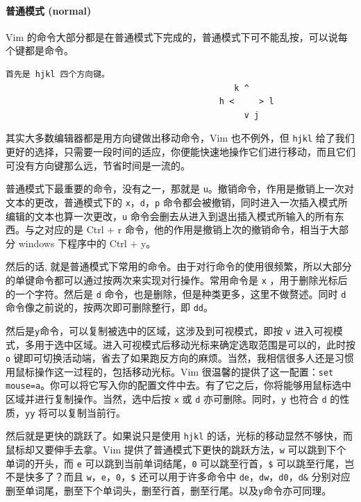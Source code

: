 \paragraph{普通模式 (normal)}

Vim 的命令大部分都是在普通模式下完成的，普通模式下可不能乱按，可以说每个键都是命令。

\begin{verbatim}
首先是 hjkl 四个方向键。                         
                                              k ^
                                           h <     > l
                                                v j
\end{verbatim}

其实大多数编辑器都是用方向键做出移动命令，Vim 也不例外，但 \texttt{hjkl} 给了我们更好的选择，只需要一段时间的适应，你便能快速地操作它们进行移动，而且它们可没有方向键那么远，节省时间是一流的。

普通模式下最重要的命令，没有之一，那就是 \texttt{u}。撤销命令，作用是撤销上一次对文本的更改，普通模式下的 \texttt{x}，\texttt{d}，\texttt{p} 命令都会被撤销，同时进入一次插入模式所编辑的文本也算一次更改，\texttt{u} 命令会删去从进入到退出插入模式所输入的所有东西。与之对应的是 Ctrl + r 命令，他的作用是撤销上次的撤销命令，相当于大部分 windows 下程序中的 Ctrl + y。

然后的话, 就是普通模式下常用的命令。由于对行命令的使用很频繁，所以大部分的单键命令都可以通过按两次来实现对行操作。常用命令是 \texttt{x} ，用于删除光标后的一个字符。然后是 \texttt{d} 命令，也是删除，但是种类更多，这里不做赘述。同时 \texttt{d} 命令像之前说的，按两次即可删除整行，即 \texttt{dd}。

然后是\texttt{y}命令，可以复制被选中的区域，这涉及到可视模式，即按 \texttt{v} 进入可视模式，多用于选中区域。进入可视模式后移动光标来确定选取范围是可以的，此时按 \texttt{o} 键即可切换活动端，省去了如果跑反方向的麻烦。当然，我相信很多人还是习惯用鼠标操作这一过程的，包括移动光标。Vim 很温馨的提供了这一配置：\texttt{set mouse=a}。你可以将它写入你的配置文件中去。有了它之后，你将能够用鼠标选中区域并进行复制操作。当然，选中后按 \texttt{x} 或 \texttt{d} 亦可删除。同时，\texttt{y} 也符合 \texttt{d} 的性质，\texttt{yy} 将可以复制当前行。

然后就是更快的跳跃了。如果说只是使用 \texttt{hjkl} 的话，光标的移动显然不够快，而鼠标却又要伸手去拿。Vim 提供了普通模式下更快的跳跃方法，\texttt{w} 可以跳到下个单词的开头，而 \texttt{e} 可以跳到当前单词结尾，\texttt{0} 可以跳至行首，\texttt{\$} 可以跳至行尾，岂不是快多了？而且 \texttt{w}，\texttt{e}，\texttt{0}，\texttt{\$} 还可以用于许多命令中 \texttt{de}，\texttt{dw}，\texttt{d0}，\texttt{d\&} 分别对应删至单词尾，删至下个单词头，删至行首，删至行尾。以及\texttt{y}命令亦可同理。

